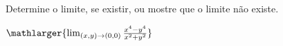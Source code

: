 Determine o limite, se existir, ou mostre que o limite não existe.

$\mathlarger{\lim_{(x,y)\rightarrow(0,0)} \frac{x^4-y^4}{x^2+y^2}}$